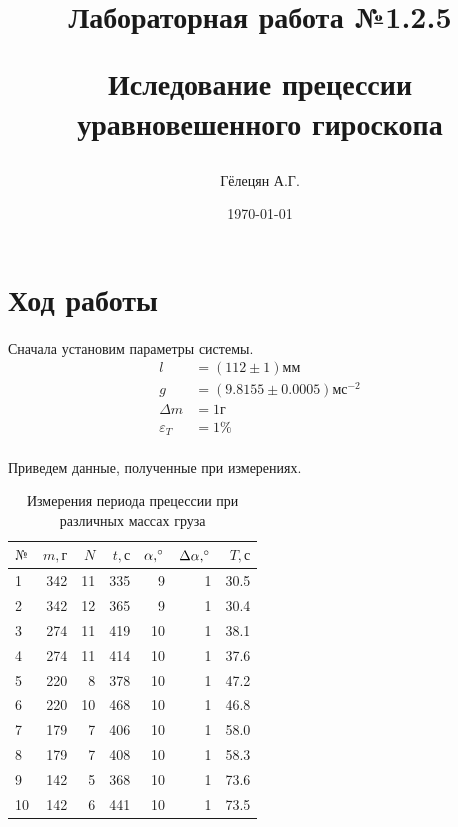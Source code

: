 \documentclass[a4paper, 12pt]{article}
\title{\begin{center}Лабораторная работа №1.2.5\end{center}
Иследование прецессии уравновешенного гироскопа}
\author{Гёлецян А.Г.}
\date{\today}
\begin{document}
    \maketitle
    \newpage

    \section{Ход работы}
    \paragraph{}
    Сначала установим параметры системы.
    \begin{align*}
     l&=(112\pm1)мм\\
     g&=(9.8155\pm0.0005)мс^{-2}\\
     \Delta m &= 1г\\
     \varepsilon_T &= 1\%
    \end{align*}

    \paragraph{}
    Приведем данные, полученные при измерениях.

    \begin{table}[h!]
        \begin{center}
        \begin{tabular}{|l|r|r|r|r|r|r|}
        \hline
        $№$ & $m, г$ &   $N$ & $t, с$ & $\alpha, \degree$ & $\Delta \alpha, \degree$ & $T, с$\\\hline
        1  &  342 &  11 &  335 &   9 &      1 &  30.5 \\
        2  &  342 &  12 &  365 &   9 &      1 &  30.4 \\
        3  &  274 &  11 &  419 &  10 &      1 &  38.1 \\
        4  &  274 &  11 &  414 &  10 &      1 &  37.6 \\
        5  &  220 &   8 &  378 &  10 &      1 &  47.2 \\
        6  &  220 &  10 &  468 &  10 &      1 &  46.8 \\
        7  &  179 &   7 &  406 &  10 &      1 &  58.0 \\
        8  &  179 &   7 &  408 &  10 &      1 &  58.3 \\
        9  &  142 &   5 &  368 &  10 &      1 &  73.6 \\
        10 &  142 &   6 &  441 &  10 &      1 &  73.5 \\
        \hline
        \end{tabular}
         \caption{Измерения периода прецессии при различных массах груза}
        \end{center}

    \end{table}
\end{document}

